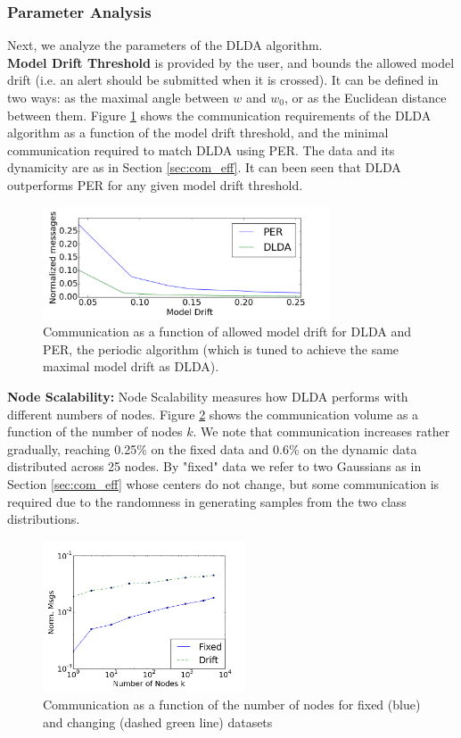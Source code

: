 \subsubsection{Parameter Analysis}\label{sec:paramanal}
Next, we analyze the parameters of the DLDA algorithm.
~~\\
\noindent\textbf{Model Drift Threshold}  is provided by the user, and bounds
the allowed model drift (i.e. an alert should be submitted when it is crossed).
It can be defined in two ways: as the maximal angle between 
$w$ and $w_0$, or as the Euclidean distance between them. 
Figure \ref{PERvsDLDAoverError} shows the communication requirements of the DLDA algorithm 
as a function of the model drift threshold, and the minimal communication required to match 
DLDA using PER.	The data and its dynamicity are as in Section \ref{sec:com_eff}.
It can been seen that  DLDA outperforms PER for
any given model drift threshold.
%
\begin{figure}
        \centering
        \includegraphics[width=85mm]{graphics/onlyDrift.png}
        \caption{Communication as a function of allowed model drift for DLDA and PER, the
        periodic algorithm (which is tuned to achieve the same maximal model drift as DLDA).}
        \label{PERvsDLDAoverError}
\end{figure}
%

\noindent\textbf{Node Scalability:}
Node Scalability measures how DLDA performs with different numbers of nodes.
Figure \ref{Nodes} shows the communication volume as a function of the number of nodes $k$.
We note that communication increases rather gradually, reaching 0.25\% on the fixed
data and 0.6\% on the dynamic data distributed across 25 nodes. By "fixed" data we
refer to two Gaussians as in Section \ref{sec:com_eff} whose centers do not change,
but some communication is required due to the randomness in generating
samples from the two class distributions. 
%
%
\begin{figure}
    \centering
  \includegraphics[width=60mm]{graphics/Nodes.png}
  \caption{Communication as a function of the number of nodes for fixed (blue)
  and changing (dashed green line) datasets}\label{Nodes}
 \end{figure}
%
%
%

